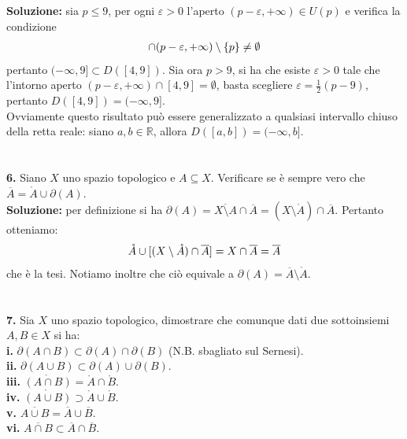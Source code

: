 \documentclass{article}
\begin{document}
\textbf{Soluzione:} sia $p \leq 9$, per ogni $\varepsilon > 0$ l'aperto $(p - \varepsilon, +\infty) \in U(p)$ e verifica la condizione
\begin{gather}
    [4, 9] \cap (p - \varepsilon, +\infty) \setminus \{ p \} \neq \emptyset \notag
\end{gather}
pertanto $(-\infty, 9] \subset D([4, 9])$. Sia ora $p > 9$, si ha che esiste $\varepsilon > 0$ tale che l'intorno aperto $(p - \varepsilon, +\infty) \cap [4, 9] = \emptyset$, basta scegliere $\varepsilon = \frac{1}{2}(p - 9)$, pertanto $D([4, 9]) = (-\infty, 9]$. \\

Ovviamente questo risultato può essere generalizzato a qualsiasi intervallo chiuso della retta reale: siano $a, b \in \mathbb{R}$, allora $D([a, b]) = (-\infty, b]$. \\ \\ \\
\textbf{6.} Siano $X$ uno spazio topologico e $A \subseteq X$. Verificare se è sempre vero che $\overline{A} = \mathring{A} \cup \partial(A)$. \\

\textbf{Soluzione:} per definizione si ha $\partial(A) = \overline{X \setminus A} \cap \overline{A} = (X \setminus \mathring{A}) \cap \overline{A}$. Pertanto otteniamo:
\begin{gather}
    \mathring{A} \cup [(X \setminus \mathring{A}) \cap \overline{A}] = X \cap \overline{A} = \overline{A} \notag
\end{gather}
che è la tesi. Notiamo inoltre che ciò equivale a $\partial(A) = \overline{A} \setminus \mathring{A}$. \\ \\ \\
\textbf{7.} Sia $X$ uno spazio topologico, dimostrare che comunque dati due sottoinsiemi $A, B \in X$ si ha: \\
\textbf{i.} $\partial (A \cap B) \subset \partial (A) \cap \partial (B)$ (N.B. sbagliato sul Sernesi). \\
\textbf{ii.} $\partial (A \cup B) \subset \partial (A) \cup \partial (B)$. \\
\textbf{iii.} $\mathring{(A \cap B)} = \mathring{A} \cap \mathring{B}$. \\
\textbf{iv.} $\mathring{(A \cup B)} \supset \mathring{A} \cup \mathring{B}$. \\
\textbf{v.} $\overline{A \cup B} = \overline{A} \cup \overline{B}$. \\
\textbf{vi.} $\overline{A \cap B} \subset \overline{A} \cap \overline{B}$. \\
\end{document}
